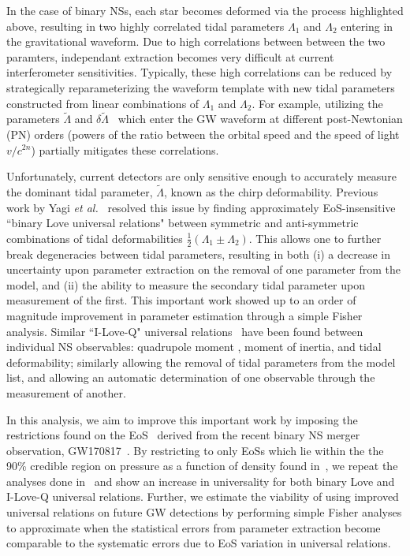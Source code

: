 \documentclass[prd,twocolumn,nofootinbib,superscriptaddress,amsmath,amssymb]{revtex4-1}
\begin{document}
In the case of binary NSs, each star becomes deformed via the process highlighted above, resulting in two highly correlated tidal parameters $\Lambda_1$ and $\Lambda_2$ entering in the gravitational waveform.
Due to high correlations between between the two paramters, independant extraction becomes very difficult at current interferometer sensitivities.
Typically, these high correlations can be reduced by strategically reparameterizing the waveform template with new tidal parameters constructed from linear combinations of $\Lambda_1$ and $\Lambda_2$.
For example, utilizing the parameters $\tilde{\Lambda}$ and $\delta \tilde{\Lambda}$~\cite{hinderer-love,Flanagan2008} which enter the GW waveform at different post-Newtonian (PN) orders (powers of the ratio between the orbital speed and the speed of light $v/c^{2n}$) partially mitigates these correlations.

Unfortunately, current detectors are only sensitive enough to accurately measure the dominant tidal parameter, $\tilde{\Lambda}$, known as the chirp deformability.
Previous work by Yagi \textit{et al.}~\cite{Yagi:binLove} resolved this issue by finding approximately EoS-insensitive ``binary Love universal relations" between symmetric and anti-symmetric combinations of tidal deformabilities $\frac{1}{2}(\Lambda_1 \pm \Lambda_2)$.
This allows one to further break degeneracies between tidal parameters, resulting in both (i) a decrease in uncertainty upon parameter extraction on the removal of one parameter from the model, and (ii) the ability to measure the secondary tidal parameter upon measurement of the first.  
This important work showed up to an order of magnitude improvement in parameter estimation through a simple Fisher analysis.
Similar ``I-Love-Q" universal relations~\cite{Yagi:ILQ} have been found between individual NS observables: quadrupole moment , moment of inertia, and tidal deformability; similarly allowing the removal of tidal parameters from the model list, and allowing an automatic determination of one observable through the measurement of another.

In this analysis, we aim to improve this important work by imposing the restrictions found on the EoS~\cite{LIGO:posterior} derived from the recent binary NS merger observation, GW170817~\cite{TheLIGOScientific:2017qsa}.
By restricting to only EoSs which lie within the the 90\% credible region on pressure as a function of density found in~\cite{LIGO:posterior}, we repeat the analyses done in~\cite{Yagi:binLove,Yagi:ILQ} and show an increase in universality for both binary Love and I-Love-Q universal relations.
Further, we estimate the viability of using improved universal relations on future GW detections by performing simple Fisher analyses to approximate when the statistical errors from parameter extraction become comparable to the systematic errors due to EoS variation in universal relations.
\end{document}
